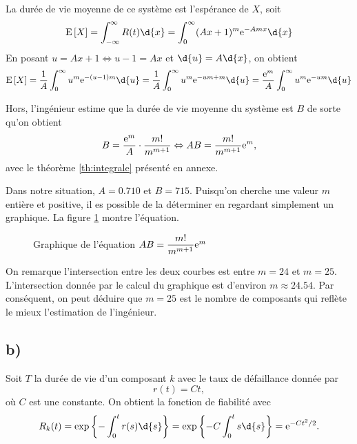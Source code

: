 \documentclass[11pt]{article}
\newcommand\Esp[1]{%
	\ensuremath{%
		\mathrm{E}\left[#1\right]%
	}%
}%
\newcommand\e{%
    \ensuremath{%
        \mathrm{e}%
    }%
}
\begin{document}
La durée de vie moyenne de ce système est l'espérance de $X$, soit
\begin{equation*}
    \Esp{X}
    =\int_{-\infty}^\infty R(t)\d{x}
    =\int_0^\infty(Ax+1)^m\e^{-Amx}\d{x}
\end{equation*}
En posant $u=Ax+1\Leftrightarrow u-1=Ax$ et $\d{u}=A\d{x}$, on obtient
\begin{equation*}
    \Esp{X}
    =\frac{1}{A}\int_0^\infty u^m\e^{-(u-1)m}\d{u}
    =\frac{1}{A}\int_0^\infty u^m\e^{-um+m}\d{u}
    =\frac{\e^{m}}{A}\int_0^\infty u^m\e^{-um}\d{u}
\end{equation*}

Hors, l'ingénieur estime que la durée de vie moyenne du système est $B$
de sorte qu'on obtient
\begin{equation*}
    B=\frac{\e^{m}}{A}\cdot\frac{m!}{m^{m+1}}\Leftrightarrow
    AB=\frac{m!}{m^{m+1}}\e^{m},
\end{equation*}
avec le théorème \ref{th:integrale} présenté en annexe.

Dans notre situation, $A=0.710$ et $B=715$. Puisqu'on cherche une valeur
$m$ entière et positive, il es possible de la déterminer en regardant
simplement un graphique. La figure \ref{fig:graph_solve} montre l'équation.

\begin{figure}[H]
    \centering
    \caption{Graphique de l'équation $AB=\dfrac{m!}{m^{m+1}}\e^{m}$}
    
    \label{fig:graph_solve}
\end{figure}

On remarque l'intersection entre les deux courbes est entre $m=24$ et
$m=25$. L'intersection donnée par le calcul du graphique est d'environ
$m\approx 24.54$. Par conséquent, on peut déduire que $m=25$ est le
nombre de composants qui reflète le mieux l'estimation de l'ingénieur.

\subsection{b)}
Soit $T$ la durée de vie d'un composant $k$ avec le taux de défaillance 
donnée par
\begin{equation*}
    r(t)=Ct,
\end{equation*}
où $C$ est une constante. On obtient la fonction de fiabilité avec
\begin{equation*}
    R_k(t)
    =\exp\left\{-\int_0^t r(s)\d{s}\right\}
    =\exp\left\{-C\int_0^t s\d{s}\right\}
    =\e^{-Ct^2/2}.
\end{equation*}
\end{document}
